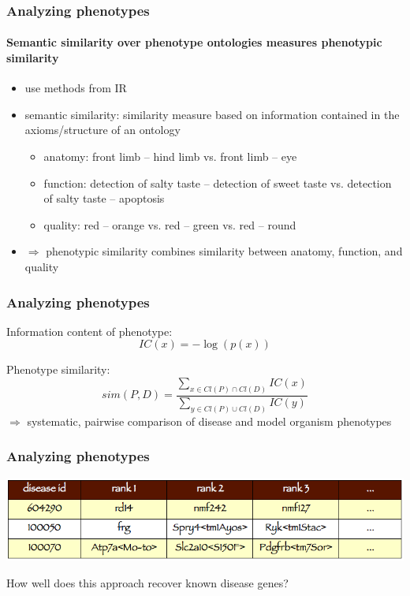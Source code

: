 \documentclass{beamer}
\begin{document}
\begin{frame}
  \frametitle{Analyzing phenotypes}
  \framesubtitle{Semantic similarity over phenotype ontologies
    measures phenotypic similarity}
  \begin{itemize}
  \item use methods from IR
  \item semantic similarity: similarity measure based on information
    contained in the axioms/structure of an ontology
    \begin{itemize}
    \item anatomy: front limb -- hind limb vs. front limb -- eye
    \item function: detection of salty taste -- detection of sweet
      taste vs. detection of salty taste -- apoptosis
    \item quality: red -- orange vs. red -- green vs. red -- round
    \end{itemize}
  \item $\Rightarrow$ phenotypic similarity combines similarity between anatomy,
    function, and quality
  \end{itemize}
\end{frame}

\begin{frame}
  \frametitle{Analyzing phenotypes}
  Information content of phenotype:
  \begin{equation*}
    IC(x) = -\log (p(x))
  \end{equation*}
  
  Phenotype similarity:
  \begin{equation*}
    sim(P,D) = \frac{\displaystyle\sum\limits_{x\in Cl(P) \cap
        Cl(D)}IC(x)}{\displaystyle\sum\limits_{y\in Cl(P) \cup
        Cl(D)}IC(y)}
  \end{equation*}
  \pause
  $\Rightarrow$ systematic, pairwise comparison of disease and model organism
    phenotypes
\end{frame}


\begin{frame}
  \frametitle{Analyzing phenotypes}
  \centerline{\includegraphics[width=1\textwidth]{table_drs.png}}
  
  \pause

  \vspace{1cm}
  How well does this approach recover known disease genes?
  
\end{frame}
\end{document}

